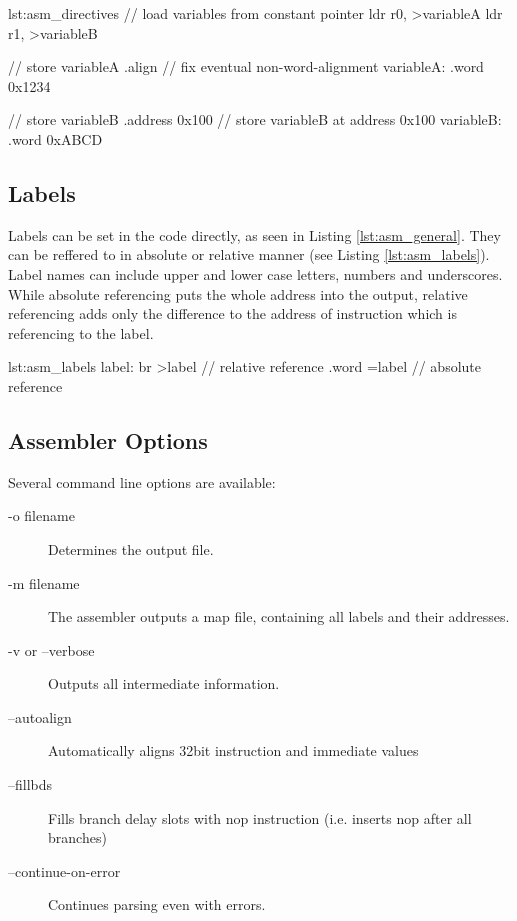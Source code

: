 \begin{asm}{lst:asm_directives}
// load variables from constant pointer
           ldr     r0,    >variableA
           ldr     r1,    >variableB

// store variableA           
           .align       // fix eventual non-word-alignment
variableA: .word 0x1234

// store variableB
           .address 0x100 // store variableB at address 0x100
variableB: .word    0xABCD
\end{asm}

\subsection{Labels}
\label{sec:labels}
Labels can be set in the code directly, as seen in Listing \ref{lst:asm_general}.
They can be reffered to in absolute or relative manner (see Listing \ref{lst:asm_labels}).
Label names can include upper and lower case letters, numbers and underscores.
While absolute referencing puts the whole address into the output, relative referencing adds only the difference to the address of instruction which is referencing to the label.
\begin{asm}{lst:asm_labels}
label:  br   >label // relative reference
       .word =label // absolute reference
\end{asm}

\subsection{Assembler Options}
Several command line options are available:
\begin{description}
\item[-o filename]Determines the output file.
\item[-m filename]The assembler outputs a map file, containing all labels and their addresses.
\item[-v or -\xspace -verbose]Outputs all intermediate information.
\item[-\xspace -autoalign]Automatically aligns 32bit instruction and immediate values
\item[-\xspace -fillbds]Fills branch delay slots with nop instruction (i.e. inserts nop after all branches)
\item[-\xspace -continue-on-error]Continues parsing even with errors.
\end{description}

